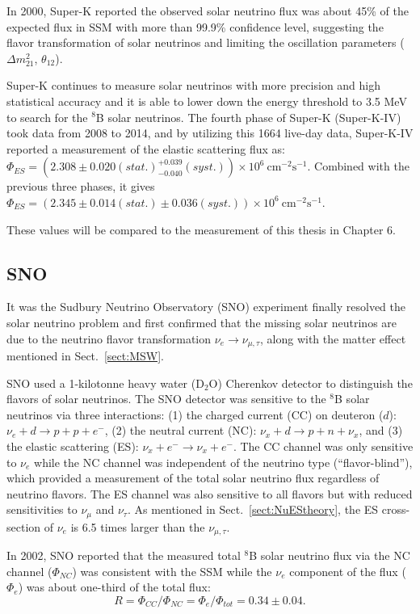 In 2000, Super-K reported the observed solar neutrino flux was about 45\% of the expected flux in SSM with more than 99.9\% confidence level, suggesting the flavor transformation of solar neutrinos and limiting the oscillation parameters ($\Delta m^2_{21}$, $\theta_{12}$)\cite{superKwebsite}. 

Super-K continues to measure solar neutrinos with more precision and high statistical accuracy and it is able to lower down the energy threshold to 3.5 MeV to search for the $^8$B solar neutrinos. The fourth phase of Super-K (Super-K-IV) took data from 2008 to 2014, and by utilizing this 1664 live-day data, Super-K-IV reported a measurement of the elastic scattering flux as: $\Phi_{ES}=(2.308\pm0.020(stat.)^{+0.039}_{-0.040}(syst.))\times 10^6~\mathrm{cm^{-2}s^{-1}}$\cite{abe2016solar}. Combined with the previous three phases, it gives $\Phi_{ES}=(2.345\pm0.014(stat.)\pm 0.036(syst.))\times 10^6~\mathrm{cm^{-2}s^{-1}}$\cite{abe2016solar}. 

These values will be compared to the measurement of this thesis in Chapter 6.

\subsection{SNO}
It was the Sudbury Neutrino Observatory (SNO) experiment finally resolved the solar neutrino problem and first confirmed that the missing solar neutrinos are due to the neutrino flavor transformation $\nu_e\to\nu_{\mu,\tau}$, along with the matter effect mentioned in Sect.~\ref{sect:MSW}. 

SNO used a 1-kilotonne heavy water (D$_2$O) Cherenkov detector to distinguish the flavors of solar neutrinos. The SNO detector was sensitive to the $^8$B solar neutrinos via three interactions: (1) the charged current (CC) on deuteron ($d$):
$\nu_e+d\to p+p+e^-$, (2) the neutral current (NC): $\nu_x+d\to p+n+\nu_x$, and (3) the elastic scattering (ES): $\nu_x+e^-\to \nu_x+e^-$. The CC channel was only sensitive to $\nu_e$ while the NC channel was independent of the neutrino type (``flavor-blind''), which provided a measurement of the total solar neutrino flux regardless of neutrino flavors. The ES channel was also sensitive to all flavors but with reduced sensitivities to $\nu_\mu$ and $\nu_\tau$\cite{ahmad2002direct}. As mentioned in Sect.~\ref{sect:NuEStheory}, the ES cross-section of $\nu_e$ is 6.5 times larger than the $\nu_{\mu,\tau}$. 

In 2002, SNO reported that the measured total $^8$B solar neutrino flux
via the NC channel ($\Phi_{NC}$) was consistent with the SSM while the $\nu_e$
component of the flux ($\Phi_e$) was about one-third of the total flux\cite{ahmad2002direct}:
\begin{equation}
R = \Phi_{CC}/\Phi_{NC} = \Phi_e/\Phi_{tot}=0.34\pm 0.04.
\end{equation}


